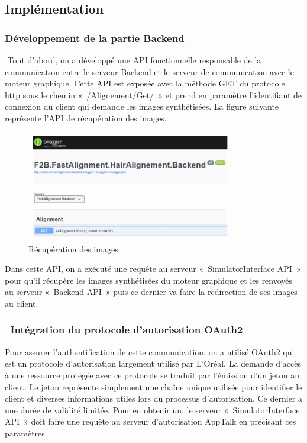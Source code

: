 \subsection{Implémentation}
\subsubsection{Développement de la partie Backend}
 Tout d’abord, on a développé une API fonctionnelle responsable de la communication entre le serveur Backend et le serveur de communication avec le moteur graphique. Cette API est exposée avec la méthode GET du protocole http sous le chemin « /Alignement/Get/ » et prend en paramètre l’identifiant de connexion du client qui demande les images synthétisées. 
La figure suivante représente l’API de récupération des images.

\begin{figure}[!ht]\centering
\includegraphics[width=0.8\textwidth]{chapitres/chapitre4/figures/AlignementGet.png}
\caption{Récupération des images}
\label{fig:git}
\end{figure}

Dans cette API, on a exécuté une requête au serveur « SimulatorInterface API » pour qu’il récupère les images synthétisées du moteur graphique et les renvoyés au serveur « Backend API » puis ce dernier va faire la redirection de ses images au client.

\subsubsection{ Intégration du protocole d’autorisation OAuth2}
Pour assurer l’authentification de cette communication, on a utilisé OAuth2 qui est un protocole d’autorisation largement utilisé par L’Oréal.
La demande d'accès à une ressource protégée avec ce protocole se traduit par l'émission d'un jeton au client. Le jeton représente simplement une chaîne unique utilisée pour identifier le client et diverses informations utiles lors du processus d'autorisation. Ce dernier a une durée de validité limitée.
Pour en obtenir un, le serveur « SimulatorInterface API » doit faire une requête au serveur d’autorisation AppTalk en précisant ces paramètres.

